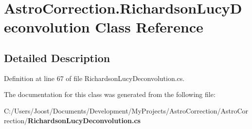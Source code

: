 \section{AstroCorrection.RichardsonLucyDeconvolution Class Reference}
\label{class_astro_correction_1_1_richardson_lucy_deconvolution}


\subsection{Detailed Description}


Definition at line 67 of file RichardsonLucyDeconvolution.cs.

The documentation for this class was generated from the following file:\begin{DoxyCompactItemize}
\item 
C:/Users/Joost/Documents/Development/MyProjects/AstroCorrection/AstroCorrection/{\bf RichardsonLucyDeconvolution.cs}\end{DoxyCompactItemize}
